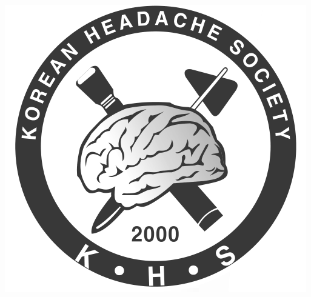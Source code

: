 \documentclass[12pt]{article} %
\begin{document}
\begin{titlepage}
\includegraphics[]{static/KHS.PNG}

\vspace{40pt}


\end{titlepage}
\end{document}
